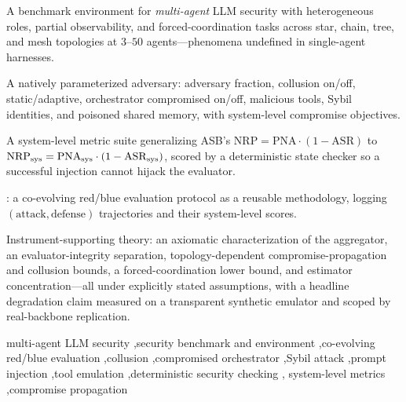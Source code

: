 \begin{abstract}
instrument end-to-end on a transparent, clearly-labelled \emph{synthetic} agent emulator
(all headlined output in this version is synthetic and provenance-stamped; a real-backbone
pilot of six open instruct models over twelve configurations is reported separately and
explicitly labelled PILOT). On that emulator the headline claim is measured: defenses effective in
the single-agent regime lose advantage under collusion and compromised-orchestrator
conditions (a per-agent guardrail's relative ASR reduction over no-defense shrinks
$41.6\%\to31.8\%\to27.6\%$ across those contexts; Table~\ref{tab:degradation}); replication
on real backbones and the deferred topologies/scales is the release-phase programme.
\end{abstract}

\begin{highlights}
\item A benchmark environment for \emph{multi-agent} LLM security with heterogeneous
roles, partial observability, and forced-coordination tasks across star, chain, tree,
and mesh topologies at $3$--$50$ agents---phenomena undefined in single-agent harnesses.
\item A natively parameterized adversary: adversary fraction, collusion on/off,
static/adaptive, orchestrator compromised on/off, malicious tools, Sybil identities,
and poisoned shared memory, with system-level compromise objectives.
\item A system-level metric suite generalizing ASB's $\mathrm{NRP}=\mathrm{PNA}\cdot(1-\mathrm{ASR})$
to $\mathrm{NRP}_{\mathrm{sys}}=\mathrm{PNA}_{\mathrm{sys}}\cdot(1-\mathrm{ASR}_{\mathrm{sys}})$, scored by a deterministic state checker so a
successful injection cannot hijack the evaluator.
\item \corb: a co-evolving red/blue evaluation protocol as a reusable methodology,
logging $(\text{attack},\text{defense})$ trajectories and their system-level scores.
\item Instrument-supporting theory: an axiomatic characterization of the aggregator,
an evaluator-integrity separation, topology-dependent compromise-propagation and
collusion bounds, a forced-coordination lower bound, and estimator concentration---all
under explicitly stated assumptions, with a headline degradation claim measured on a
transparent synthetic emulator and scoped by real-backbone replication.
\end{highlights}

\begin{keyword}
multi-agent LLM security \sep security benchmark and environment \sep co-evolving
red/blue evaluation \sep collusion \sep compromised orchestrator \sep Sybil attack
\sep prompt injection \sep tool emulation \sep deterministic security checking \sep
system-level metrics \sep compromise propagation
\end{keyword}
